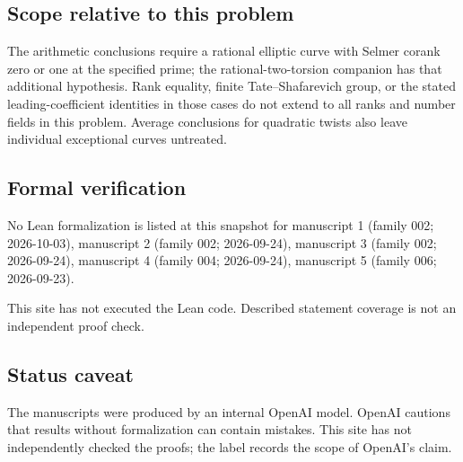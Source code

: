 \documentclass[11pt]{article}
\begin{document}
\subsection{Scope relative to this problem}
The arithmetic conclusions require a rational elliptic curve with Selmer corank zero or one at the specified prime; the rational-two-torsion companion has that additional hypothesis. Rank equality, finite Tate--Shafarevich group, or the stated leading-coefficient identities in those cases do not extend to all ranks and number fields in this problem. Average conclusions for quadratic twists also leave individual exceptional curves untreated.

\subsection{Formal verification}
No Lean formalization is listed at this snapshot for manuscript 1 (family 002; 2026-10-03), manuscript 2 (family 002; 2026-09-24), manuscript 3 (family 002; 2026-09-24), manuscript 4 (family 004; 2026-09-24), manuscript 5 (family 006; 2026-09-23).

This site has not executed the Lean code. Described statement coverage is not an independent proof check.

\subsection{Status caveat}
The manuscripts were produced by an internal OpenAI model. OpenAI cautions that results without formalization can contain mistakes. This site has not independently checked the proofs; the label records the scope of OpenAI's claim.
\end{document}
